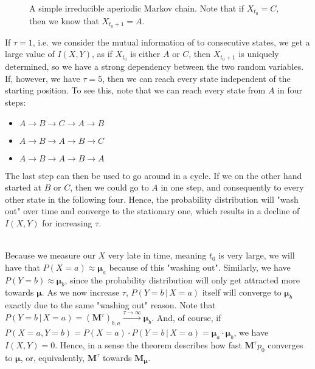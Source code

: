 \documentclass[../../main.tex]{subfiles}
\begin{document}
    \begin{figure}[h]
    \center
    \caption{A simple irreducible aperiodic Markov chain. Note that if $X_{t_0} = C$, then we know that $X_{t_0+1} = A$.}
    \label{fig:markov_chain}
    \end{figure}

    \noindent
    If $\tau = 1$, i.e. we consider the mutual information of to consecutive states, we get a large value of $I(X, Y)$, as if $X_{t_0}$ is either $A$ or $C$, then $X_{t_0+1}$ is uniquely determined, so we have a strong dependency between the two random variables. If, however, we have $\tau = 5$, then we can reach every state independent of the starting position. To see this, note that we can reach every state from $A$ in four steps:
    \begin{itemize}
        \item $A \rightarrow B \rightarrow C \rightarrow A \rightarrow B$
        \item $A \rightarrow B \rightarrow A \rightarrow B \rightarrow C$
        \item $A \rightarrow B \rightarrow A \rightarrow B \rightarrow A$
    \end{itemize}
    The last step can then be used to go around in a cycle. If we on the other hand started at $B$ or $C$, then we could go to $A$ in one step, and consequently to every other state in the following four. Hence, the probability distribution will "wash out" over time and converge to the stationary one, which results in a decline of $I(X, Y)$ for increasing $\tau$.
    
    ~\\
    Because we measure our $X$ very late in time, meaning $t_0$ is very large, we will have that $P(X = a) \approx \boldsymbol{\mu}_a$ because of this "washing out". Similarly, we have $P(Y = b) \approx \boldsymbol{\mu}_b$, since the probability distribution will only get attracted more towards $\boldsymbol{\mu}$. As we now increase $\tau$, $P(Y = b \,|\, X = a)$ itself will converge to $\boldsymbol{\mu}_b$ exactly due to the same "washing out" reason. Note that $P(Y = b \,|\, X = a) = (\boldsymbol{M}^{\tau})_{b,a} \xrightarrow{\tau \to \infty}  \boldsymbol{\mu}_b$. And, of course, if $P(X = a, Y = b) = P(X = a) \cdot P(Y = b \,|\, X = a) = \boldsymbol{\mu}_a \cdot \boldsymbol{\mu}_b$, we have $I(X, Y) = 0$. Hence, in a sense the theorem describes how fast $\boldsymbol{M}^{\tau} p_0$ converges to $\boldsymbol{\mu}$, or, equivalently, $\boldsymbol{M}^{\tau}$ towards $\boldsymbol{M}_{\boldsymbol{\mu}}$.
\end{document}
